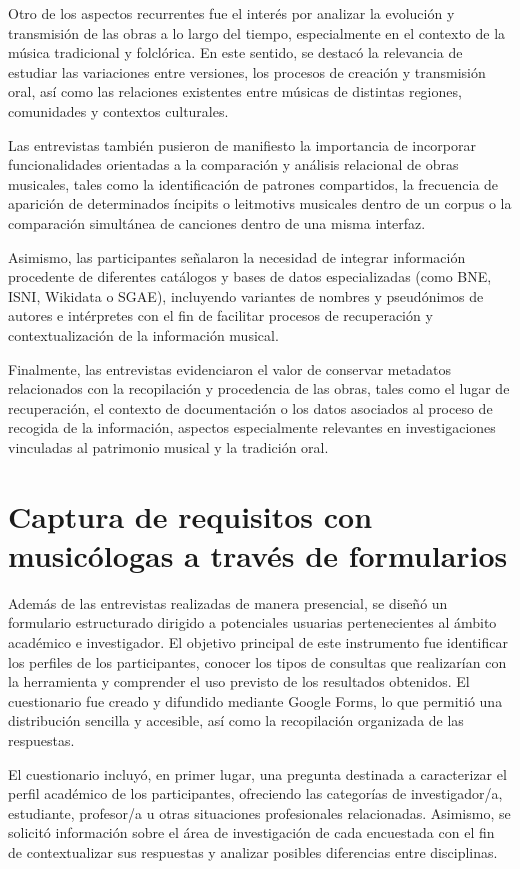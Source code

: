 Otro de los aspectos recurrentes fue el interés por analizar la evolución y transmisión de las obras a lo largo del tiempo, especialmente en el contexto de la música tradicional y folclórica. En este sentido, se destacó la relevancia de estudiar las variaciones entre versiones, los procesos de creación y transmisión oral, así como las relaciones existentes entre músicas de distintas regiones, comunidades y contextos culturales.

Las entrevistas también pusieron de manifiesto la importancia de incorporar funcionalidades orientadas a la comparación y análisis relacional de obras musicales, tales como la identificación de patrones compartidos, la frecuencia de aparición de determinados íncipits o leitmotivs musicales dentro de un corpus o la comparación simultánea de canciones dentro de una misma interfaz.

Asimismo, las participantes señalaron la necesidad de integrar información procedente de diferentes catálogos y bases de datos especializadas (como BNE, ISNI, Wikidata o SGAE), incluyendo variantes de nombres y pseudónimos de autores e intérpretes con el fin de facilitar procesos de recuperación y contextualización de la información musical.

Finalmente, las entrevistas evidenciaron el valor de conservar metadatos relacionados con la recopilación y procedencia de las obras, tales como el lugar de recuperación, el contexto de documentación o los datos asociados al proceso de recogida de la información, aspectos especialmente relevantes en investigaciones vinculadas al patrimonio musical y la tradición oral.

\section{Captura de requisitos con musicólogas a través de formularios}
Además de las entrevistas realizadas de manera presencial, se diseñó un formulario estructurado dirigido a potenciales usuarias pertenecientes al ámbito académico e investigador. El objetivo principal de este instrumento fue identificar los perfiles de los participantes, conocer los tipos de consultas que realizarían con la herramienta y comprender el uso previsto de los resultados obtenidos.
El cuestionario fue creado y difundido mediante Google Forms, lo que permitió una distribución sencilla y accesible, así como la recopilación organizada de las respuestas.

El cuestionario incluyó, en primer lugar, una pregunta destinada a caracterizar el perfil académico de los participantes, ofreciendo las categorías de investigador/a, estudiante, profesor/a u otras situaciones profesionales relacionadas. Asimismo, se solicitó información sobre el área de investigación de cada encuestada con el fin de contextualizar sus respuestas y analizar posibles diferencias entre disciplinas.

